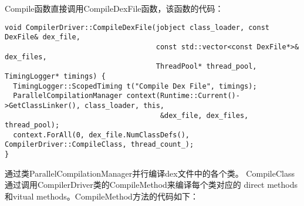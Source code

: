 Compile函数直接调用CompileDexFile函数，该函数的代码：
\begin{lstlisting}
void CompilerDriver::CompileDexFile(jobject class_loader, const DexFile& dex_file,
                                    const std::vector<const DexFile*>& dex_files,
                                    ThreadPool* thread_pool, TimingLogger* timings) {
  TimingLogger::ScopedTiming t("Compile Dex File", timings);
  ParallelCompilationManager context(Runtime::Current()->GetClassLinker(), class_loader, this,
                                     &dex_file, dex_files, thread_pool);
  context.ForAll(0, dex_file.NumClassDefs(), CompilerDriver::CompileClass, thread_count_);
}
\end{lstlisting}
通过类ParallelCompilationManager并行编译dex文件中的各个类。
CompileClass通过调用CompilerDriver类的CompileMethod来编译每个类对应的
direct methods和vitual methods。CompileMethod方法的代码如下：
